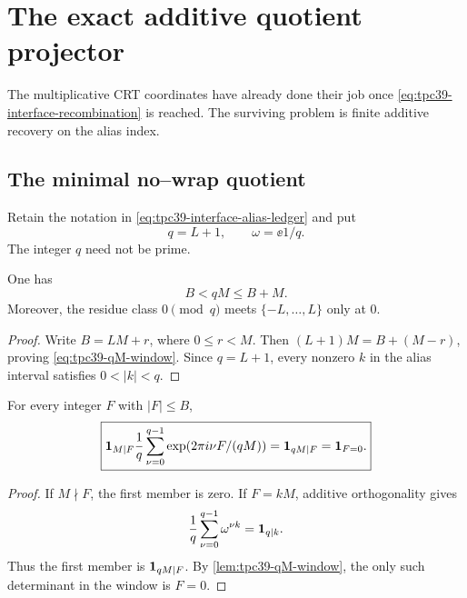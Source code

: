 \section{The exact additive quotient projector}
\label{sec:tpc39-projector}

The multiplicative CRT coordinates have already done their job once
\eqref{eq:tpc39-interface-recombination} is reached.  The surviving
problem is finite additive recovery on the alias index.

\subsection{The minimal no--wrap quotient}

Retain the notation in \eqref{eq:tpc39-interface-alias-ledger} and put
\begin{equation}
 q=L+1,
 \qquad
 \omega=\ee{1/q}.
 \label{eq:tpc39-projector-q}
\end{equation}
The integer \(q\) need not be prime.

\begin{lemma}
\label{lem:tpc39-qM-window}
One has
\begin{equation}
 B<qM\le B+M.
 \label{eq:tpc39-qM-window}
\end{equation}
Moreover, the residue class \(0\pmod q\) meets
\(\{-L,\ldots,L\}\) only at \(0\).
\end{lemma}

\begin{proof}
Write \(B=LM+r\), where \(0\le r<M\).  Then
\((L+1)M=B+(M-r)\), proving \eqref{eq:tpc39-qM-window}.  Since
\(q=L+1\), every nonzero \(k\) in the alias interval satisfies
\(0<|k|<q\).
\end{proof}

\begin{theorem}
\label{thm:tpc39-additive-quotient-identity}
For every integer \(F\) with \(|F|\le B\),
\begin{equation}
 \boxed{
 \mathbf 1_{M\mid F}\frac1q\sum_{\nu=0}^{q-1}
 \exp(2\pi i \nu F/(qM))
 =\mathbf 1_{qM\mid F}
 =\mathbf 1_{F=0}.}
 \label{eq:tpc39-additive-quotient-identity}
\end{equation}
\end{theorem}

\begin{proof}
If \(M\nmid F\), the first member is zero.  If \(F=kM\), additive
orthogonality gives
\[
 \frac1q\sum_{\nu=0}^{q-1}\omega^{\nu k}
 =\mathbf 1_{q\mid k}.
\]
Thus the first member is \(\mathbf 1_{qM\mid F}\).  By
\cref{lem:tpc39-qM-window}, the only such determinant in the window is
\(F=0\).
\end{proof}

